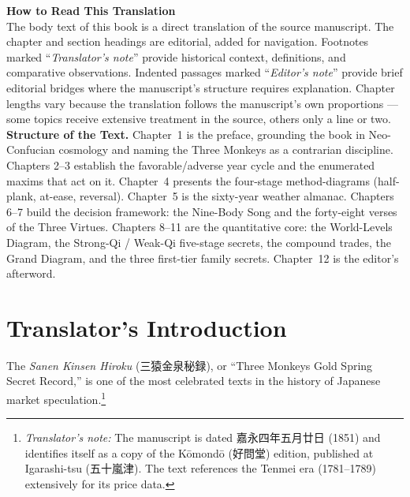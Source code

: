 \documentclass[10pt, openany]{book}
\newcommand{\jp}[1]{{\japanesefont #1}}
\newcommand{\tn}[1]{\footnote{\textit{Translator's note:} #1}}
\begin{document}
\begin{small}
\noindent\textbf{How to Read This Translation}\\[0.3em]
\noindent The body text of this book is a direct translation of the
source manuscript. The chapter and section headings are editorial,
added for navigation. Footnotes marked ``\textit{Translator's note}''
provide historical context, definitions, and comparative observations.
Indented passages marked ``\textit{Editor's note}'' provide brief
editorial bridges where the manuscript's structure requires
explanation. Chapter lengths vary because the translation follows the
manuscript's own proportions --- some topics receive extensive
treatment in the source, others only a line or two.\\[0.5em]
\noindent\textbf{Structure of the Text.}
Chapter~1 is the preface, grounding the book in Neo-Confucian
cosmology and naming the Three Monkeys as a contrarian discipline.
Chapters 2--3 establish the favorable/adverse year cycle and the
enumerated maxims that act on it. Chapter~4 presents the four-stage
method-diagrams (half-plank, at-ease, reversal). Chapter~5 is the
sixty-year weather almanac. Chapters 6--7 build the decision
framework: the Nine-Body Song and the forty-eight verses of the
Three Virtues. Chapters 8--11 are the quantitative core: the
World-Levels Diagram, the Strong-Qi / Weak-Qi five-stage secrets, the
compound trades, the Grand Diagram, and the three first-tier family
secrets. Chapter~12 is the editor's afterword.
\end{small}
\newpage

\thispagestyle{empty}
\tableofcontents
\newpage

\chapter*{Translator's Introduction}

The \textit{Sanen Kinsen Hiroku} (\jp{三猿金泉秘録}), or ``Three Monkeys
Gold Spring Secret Record,'' is one of the most celebrated texts in the
history of Japanese market speculation.\tn{The manuscript is dated
\jp{嘉永四年五月廿日} (1851) and identifies itself as a copy of the
K\=omond\=o (\jp{好問堂}) edition, published at Igarashi-tsu
(\jp{五十嵐津}). The text references the Tenmei era (1781--1789)
extensively for its price data.}
\end{document}
